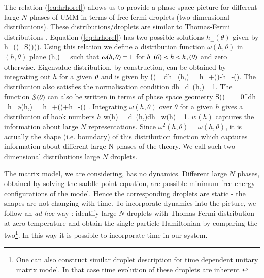 \documentclass[final,3p,12pt,times]{elsarticle}
\numberwithin{equation}{section}
\begin{document}
The relation (\ref{eq:hrhorel}) allows us to provide a phase space picture for different large $N$ phases of UMM in terms of free fermi droplets (two dimensional distributions). These distributions/droplets are similar to Thomas-Fermi distributions \cite{thomasfermi1,thomasfermi2}. Equation (\ref{eq:hrhorel}) has two possible solutions $h_{\pm}(\theta)$ given by
%
\ben\label{eq:hpm1}
h_{\pm}(\theta)=S(\theta)\pm \pi \rho(\theta).
\een
%
Using this relation we define a distribution function $\omega(h,\theta)$ in $(h,\theta)$ plane
%
\be \label{eq:phasespacedistri}
\omega(h,\q) = \Theta{}\rb
\ee
%
such that $\omega(h,\theta)=1$ for $h_-(\theta)<h<h_+(\theta)$ and zero otherwise.
Eigenvalue distribution, by construction, can be obtained by integrating
out $h$ for a given $\theta$ and is given by
%
\be\label{eq:rhofromphasespace}
\r(\q)= \int dh \ \omega(h,\q) = {h_+(\q)-h_-(\q)\pi}.
\ee
%
The distribution also satisfies the normalisation condition
%
\ben\label{eq:omeganormalisation}
\int dh \ d\theta \ \omega(h,\theta) =1.
\een
%
The function $S(\theta)$ can also be written in terms of phase space geometry
%
\be\label{eq:Sfromphasespace}
S(\q) = \int_0^\infty dh \ h \ \o(h,\q) =
{h_+(\q)+h_-(\q) }.
\ee
%
Integrating $\omega(h,\theta)$ over $\theta$ for a given $h$ gives a distribution of hook numbers $h$
%
\ben\label{eq:hdistribution}
w(h) = \int d\theta \ \omega(h,\theta)\quad \with \quad \int dh \ w(h) =1.
\een
%
$w(h)$ captures the information about large $N$ representations. Since $\omega^2(h,\theta) = \omega(h,\theta)$, it is actually the shape (i.e. boundary) of this distribution function which captures information about different large N phases of the theory. We call such two dimensional distributions large $N$ droplets.

The matrix model, we are considering, has no dynamics. Different large $N$ phases, obtained by solving the saddle point equation, are possible minimum free energy configurations of the model. Hence the corresponding droplets are static - the shapes are not changing with time. To incorporate dynamics into the picture, we follow an \emph{ad hoc} way : identify large $N$ droplets with Thomas-Fermi distribution at zero temperature and obtain the single particle Hamiltonian by comparing the two\footnote{One can also construct similar droplet description for time dependent unitary matrix model. In that case time evolution of these droplets are inherent \cite{Chattopadhyay:2020rle}}. In this way it is possible to incorporate time in our system.
\end{document}
